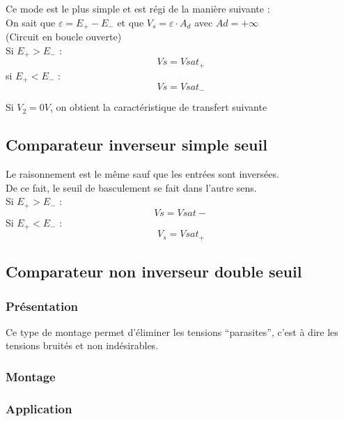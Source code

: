 
Ce mode est le plus simple et est régi de la manière suivante : \\

On sait que $\varepsilon = E_+ - E_-$ et que $V_s=\varepsilon \cdot A_d$ avec $Ad=+\infty$ \\
(Circuit en boucle ouverte) \\


Si $E_+>E_-$ :
$$Vs=Vsat_+$$ 
 si $E_+<E_-$ :
$$Vs=Vsat_-$$

Si $V_2=0V$, on obtient la caractéristique de transfert suivante  



\subsection{Comparateur inverseur simple seuil}

Le raisonnement est le même sauf que les entrées sont inversées. \\
De ce fait, le seuil de basculement se fait dans l’autre sens. \\

Si $E_+>E_-$ :
$$Vs=Vsat-$$
Si $E_+<E_-$ :
$$V_s=Vsat_+$$

\subsection{Comparateur non inverseur double seuil}


\subsubsection{Présentation}

Ce type de montage permet d’éliminer les tensions “parasites”, c’est à dire les tensions bruités et non indésirables. \\

\subsubsection{Montage}


\subsubsection{Application}

